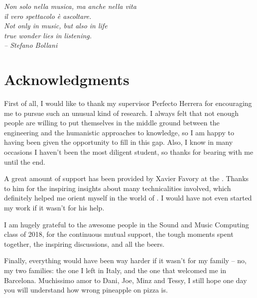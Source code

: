 
\begin{flushright}{\slshape
Non solo nella musica, ma anche nella vita \\
il vero spettacolo è ascoltare. \\ \medskip
Not only in music, but also in life \\
true wonder lies in listening. \\ \bigskip
-- Stefano Bollani
}
\end{flushright}



\bigskip

\begingroup
\let\clearpage\relax
\let\cleardoublepage\relax
\let\cleardoublepage\relax
\chapter*{Acknowledgments}
First of all, I would like to thank my supervisor Perfecto Herrera for encouraging me to pursue such an unusual kind of research. I always felt that not enough people are willing to put themselves in the middle ground between the engineering and the humanistic approaches to knowledge, so I am happy to having been given the opportunity to fill in this gap. Also, I know in many occasions I haven't been the most diligent student, so thanks for bearing with me until the end.

A great amount of support has been provided by Xavier Favory at the . Thanks to him for the inspiring insights about many technicalities involved, which definitely helped me orient myself in the world of . I would have not even started my work if it wasn't for his help.

I am hugely grateful to the awesome people in the Sound and Music Computing class of 2018, for the continuous mutual support, the tough moments spent together, the inspiring discussions, and all the beers.

Finally, everything would have been way harder if it wasn't for my family -- no, my two families: the one I left in Italy, and the one that welcomed me in Barcelona. Muchissimo amor to Dani, Joe, Minz and Tessy, I still hope one day you will understand how wrong pineapple on pizza is.

\bigskip

\endgroup



